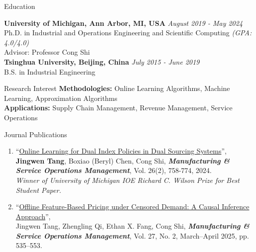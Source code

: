 \documentclass{resume}
\begin{document}

\begin{rSection}{Education}

{\bf University of Michigan, Ann Arbor, MI, USA} \hfill {\em August 2019 - May 2024} 
\\ Ph.D. in Industrial and Operations Engineering and Scientific Computing \hfill{\em  (GPA: 4.0/4.0)}
\\Advisor: Professor Cong Shi \hfill
\\{\bf Tsinghua University, Beijing, China} \hfill {\em July 2015 - June 2019} 
\\ B.S. in Industrial Engineering
\end{rSection}

\begin{rSection}{Research Interest}
 {\bf Methodologies: } Online Learning Algorithms, Machine Learning, Approximation Algorithms\\
 {\bf Applications: } Supply Chain Management, Revenue Management, Service Operations
\end{rSection}


\begin{rSection}{Journal Publications}
\begin{enumerate}
    \item ``\href{https://pubsonline.informs.org/doi/10.1287/msom.2022.0323}{Online Learning for Dual Index Policies in Dual Sourcing Systems}'', \\ \textbf{Jingwen Tang}, Boxiao (Beryl) Chen, Cong Shi, \emph{\textbf{Manufacturing \& Service Operations Management}}, Vol. 26(2), 758-774, 2024. \\
    {\it Winner of University of Michigan IOE Richard C. Wilson Prize for Best Student Paper.}

  \item ``\href{https://pubsonline.informs.org/doi/10.1287/msom.2024.1061}{Offline Feature-Based Pricing under Censored Demand: A Causal Inference Approach}'', \\Jingwen Tang, Zhengling Qi, Ethan X. Fang, Cong Shi, \emph{\textbf{Manufacturing \& Service Operations Management}}, Vol. 27, No. 2, March–April 2025, pp. 535–553. 

\end{enumerate}
\end{rSection}
\end{document}

